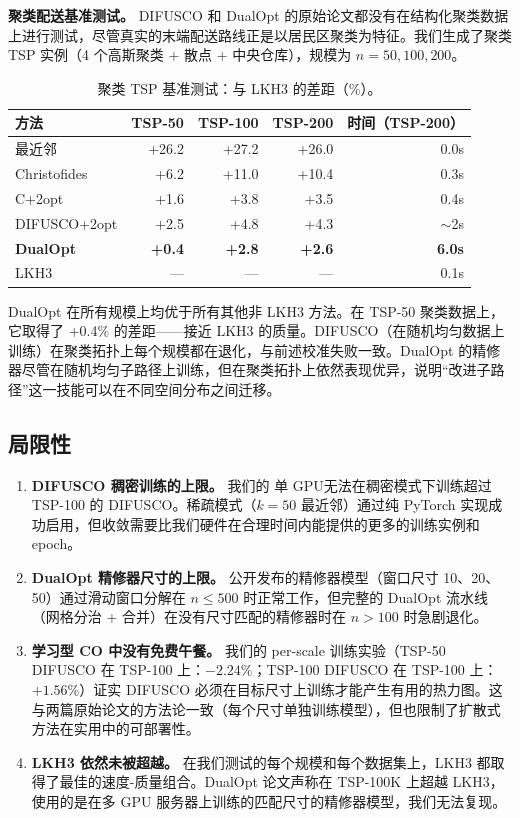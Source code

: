 \documentclass[11pt,a4paper]{ctexart}
\begin{document}
\textbf{聚类配送基准测试。} DIFUSCO 和 DualOpt 的原始论文都没有在结构化聚类数据上进行测试，尽管真实的末端配送路线正是以居民区聚类为特征。我们生成了聚类 TSP 实例（4 个高斯聚类 + 散点 + 中央仓库），规模为 $n=50,100,200$。

\begin{table}[H]
\centering
\small
\caption{聚类 TSP 基准测试：与 LKH3 的差距（\%）。}
\label{tab:clustered}
\begin{tabular}{@{}lrrrr@{}}
\toprule
方法 & TSP-50 & TSP-100 & TSP-200 & 时间（TSP-200）\\
\midrule
最近邻 & +26.2 & +27.2 & +26.0 & 0.0s \\
Christofides & +6.2 & +11.0 & +10.4 & 0.3s \\
C+2opt & +1.6 & +3.8 & +3.5 & 0.4s \\
DIFUSCO+2opt & +2.5 & +4.8 & +4.3 & $\sim$2s \\
\textbf{DualOpt} & \textbf{+0.4} & \textbf{+2.8} & \textbf{+2.6} & \textbf{6.0s} \\
LKH3 & --- & --- & --- & 0.1s \\
\bottomrule
\end{tabular}
\end{table}

DualOpt 在所有规模上均优于所有其他非 LKH3 方法。在 TSP-50 聚类数据上，它取得了 +0.4\% 的差距——接近 LKH3 的质量。DIFUSCO（在随机均匀数据上训练）在聚类拓扑上每个规模都在退化，与前述校准失败一致。DualOpt 的精修器尽管在随机均匀子路径上训练，但在聚类拓扑上依然表现优异，说明``改进子路径''这一技能可以在不同空间分布之间迁移。

\subsection{局限性}

\begin{enumerate}[nosep]
\item \textbf{DIFUSCO 稠密训练的上限。} 我们的 单 GPU无法在稠密模式下训练超过 TSP-100 的 DIFUSCO。稀疏模式（$k=50$ 最近邻）通过纯 PyTorch 实现成功启用，但收敛需要比我们硬件在合理时间内能提供的更多的训练实例和 epoch。
\item \textbf{DualOpt 精修器尺寸的上限。} 公开发布的精修器模型（窗口尺寸 10、20、50）通过滑动窗口分解在 $n \leq 500$ 时正常工作，但完整的 DualOpt 流水线（网格分治 + 合并）在没有尺寸匹配的精修器时在 $n>100$ 时急剧退化。
\item \textbf{学习型 CO 中没有免费午餐。} 我们的 per-scale 训练实验（TSP-50 DIFUSCO 在 TSP-100 上：$-2.24\%$；TSP-100 DIFUSCO 在 TSP-100 上：$+1.56\%$）证实 DIFUSCO 必须在目标尺寸上训练才能产生有用的热力图。这与两篇原始论文的方法论一致（每个尺寸单独训练模型），但也限制了扩散式方法在实用中的可部署性。
\item \textbf{LKH3 依然未被超越。} 在我们测试的每个规模和每个数据集上，LKH3 都取得了最佳的速度-质量组合。DualOpt 论文声称在 TSP-100K 上超越 LKH3，使用的是在多 GPU 服务器上训练的匹配尺寸的精修器模型，我们无法复现。
\end{enumerate}
\end{document}
